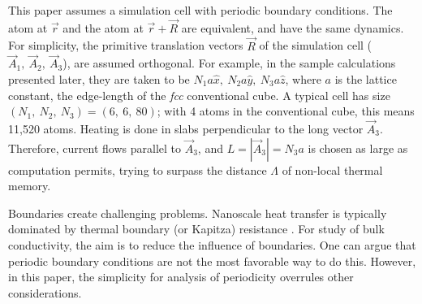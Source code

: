 \documentclass[aps,prb,twocolumn,showpacs,superscriptaddress]{revtex4-1}\begin{tiny}\end{tiny}
\begin{document}
This paper assumes a simulation cell with periodic boundary conditions.  The atom at
$\vec{r}$ and the atom at $\vec{r}+\vec{R}$ are equivalent, and have the same dynamics.  For simplicity, the 
primitive translation vectors $\vec{R}$ of the simulation cell ($\vec{A}_1, \   \vec{A}_2, \  \vec{A}_3$), are
assumed orthogonal.  For example, in the sample calculations presented later, they are taken
to be $N_1 a \hat{x}, \ N_2 a \hat{y}, \ N_3 a \hat{z}$, where $a$
is the lattice constant, the edge-length of the {\it fcc} conventional cube.   A typical cell has size
$(N_1, \ N_2, \ N_3)=(6, \ 6, \ 80)$; with 4 atoms in the conventional cube, this means
11,520 atoms.  Heating is done in slabs perpendicular to the long vector ${\vec A}_3$.
Therefore, current flows parallel to $\vec{A}_3$,
and $L= |\vec{A}_3|=N_3a$ is chosen as large as computation permits, trying to surpass the 
distance $\Lambda$ of non-local thermal memory.

Boundaries create challenging problems.  Nanoscale heat transfer is typically
dominated by thermal boundary (or Kapitza) resistance \cite{Kapres}.
For study of bulk conductivity, the aim is to
reduce the influence of boundaries.  One can argue \cite{Liang} that periodic boundary 
conditions are not the most favorable way to do this.  However, in this paper, the
simplicity for analysis of periodicity overrules other considerations.   
\end{document}
